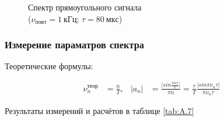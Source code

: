 \documentclass[a4paper, 12pt]{article}
\begin{document}
                \begin{figure}[ht]
                    \centering
                    \begin{minipage}[ht]{0.49\linewidth}
                        \caption{Спектр прямоугольного сигнала\\($\nu_{повт} = 1~кГц$; $\tau = 80~мкс$)}
                        \label{plot:A.6.7}
                    \end{minipage}
                \end{figure}

            \subsubsection{Измерение параматров спектра}

                Теоретические формулы:

                \begin{align*}
                    \nu_n^{теор} &= \frac{n}{T}, & \vert a_n \vert &= \frac{\vert sin\frac{\pi n \tau}{T} \vert}{\pi n} = \frac{\tau}{T} \frac{\vert sin \pi \nu_n \tau \vert}{\pi \nu_n \tau}
                \end{align*}

                Результаты измерений и расчётов в таблице \ref{tab:A.7}
\end{document}
